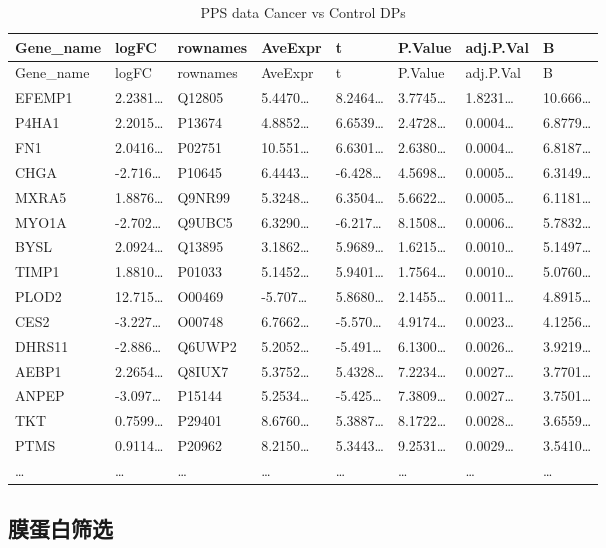 \documentclass[
]{article}
\begin{document}
\begin{longtable}[]{@{}llllllll@{}}
\caption{\label{tab:PPS-data-Cancer-vs-Control-DPs}PPS data Cancer vs Control DPs}\tabularnewline
\toprule
Gene\_name & logFC & rownames & AveExpr & t & P.Value & adj.P.Val & B\tabularnewline
\midrule
\endfirsthead
\toprule
Gene\_name & logFC & rownames & AveExpr & t & P.Value & adj.P.Val & B\tabularnewline
\midrule
\endhead
EFEMP1 & 2.2381\ldots{} & Q12805 & 5.4470\ldots{} & 8.2464\ldots{} & 3.7745\ldots{} & 1.8231\ldots{} & 10.666\ldots{}\tabularnewline
P4HA1 & 2.2015\ldots{} & P13674 & 4.8852\ldots{} & 6.6539\ldots{} & 2.4728\ldots{} & 0.0004\ldots{} & 6.8779\ldots{}\tabularnewline
FN1 & 2.0416\ldots{} & P02751 & 10.551\ldots{} & 6.6301\ldots{} & 2.6380\ldots{} & 0.0004\ldots{} & 6.8187\ldots{}\tabularnewline
CHGA & -2.716\ldots{} & P10645 & 6.4443\ldots{} & -6.428\ldots{} & 4.5698\ldots{} & 0.0005\ldots{} & 6.3149\ldots{}\tabularnewline
MXRA5 & 1.8876\ldots{} & Q9NR99 & 5.3248\ldots{} & 6.3504\ldots{} & 5.6622\ldots{} & 0.0005\ldots{} & 6.1181\ldots{}\tabularnewline
MYO1A & -2.702\ldots{} & Q9UBC5 & 6.3290\ldots{} & -6.217\ldots{} & 8.1508\ldots{} & 0.0006\ldots{} & 5.7832\ldots{}\tabularnewline
BYSL & 2.0924\ldots{} & Q13895 & 3.1862\ldots{} & 5.9689\ldots{} & 1.6215\ldots{} & 0.0010\ldots{} & 5.1497\ldots{}\tabularnewline
TIMP1 & 1.8810\ldots{} & P01033 & 5.1452\ldots{} & 5.9401\ldots{} & 1.7564\ldots{} & 0.0010\ldots{} & 5.0760\ldots{}\tabularnewline
PLOD2 & 12.715\ldots{} & O00469 & -5.707\ldots{} & 5.8680\ldots{} & 2.1455\ldots{} & 0.0011\ldots{} & 4.8915\ldots{}\tabularnewline
CES2 & -3.227\ldots{} & O00748 & 6.7662\ldots{} & -5.570\ldots{} & 4.9174\ldots{} & 0.0023\ldots{} & 4.1256\ldots{}\tabularnewline
DHRS11 & -2.886\ldots{} & Q6UWP2 & 5.2052\ldots{} & -5.491\ldots{} & 6.1300\ldots{} & 0.0026\ldots{} & 3.9219\ldots{}\tabularnewline
AEBP1 & 2.2654\ldots{} & Q8IUX7 & 5.3752\ldots{} & 5.4328\ldots{} & 7.2234\ldots{} & 0.0027\ldots{} & 3.7701\ldots{}\tabularnewline
ANPEP & -3.097\ldots{} & P15144 & 5.2534\ldots{} & -5.425\ldots{} & 7.3809\ldots{} & 0.0027\ldots{} & 3.7501\ldots{}\tabularnewline
TKT & 0.7599\ldots{} & P29401 & 8.6760\ldots{} & 5.3887\ldots{} & 8.1722\ldots{} & 0.0028\ldots{} & 3.6559\ldots{}\tabularnewline
PTMS & 0.9114\ldots{} & P20962 & 8.2150\ldots{} & 5.3443\ldots{} & 9.2531\ldots{} & 0.0029\ldots{} & 3.5410\ldots{}\tabularnewline
\ldots{} & \ldots{} & \ldots{} & \ldots{} & \ldots{} & \ldots{} & \ldots{} & \ldots{}\tabularnewline
\bottomrule
\end{longtable}

\hypertarget{ux819cux86cbux767dux7b5bux9009}{%
\subsection{膜蛋白筛选}\label{ux819cux86cbux767dux7b5bux9009}}
\end{document}
